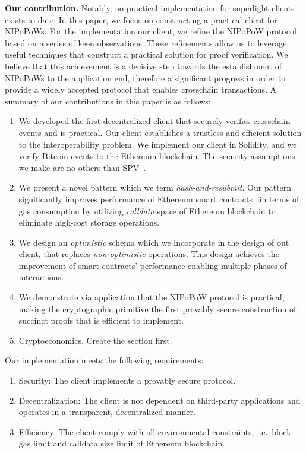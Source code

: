 \textbf{Our contribution.} Notably, no practical implementation for superlight
clients exists to date. In this paper, we focus on constructing a practical
client for NIPoPoWs. For the implementation our client, we refine the
NIPoPoW protocol based on a series of keen observations. These refinements
allow us to leverage useful techniques that construct a practical solution for
proof verification. We believe that this achievement is a decisive step towards
the establishment of NIPoPoWs to the application end, therefore a significant
progress in order to provide a widely accepted protocol that enables crosschain
transactions. A summary of our contributions in this paper is as follows:
\begin{enumerate}
\item We developed the first decentralized client that securely verifies
crosschain events and is practical. Our client establishes a trustless and
efficient solution to the interoperability problem. We implement our client
in Solidity, and we verify Bitcoin events to the Ethereum blockchain. The
security assumptions we make are no others than
SPV~\cite{eclipse, eclipse-ethereum}.
\item We present a novel pattern which we term \emph{hash-and-resubmit}. Our
pattern significantly improves performance of Ethereum smart
contracts~\cite{wood, buterin} in terms of gas consumption by utilizing
\emph{calldata} space of Ethereum blockchain to eliminate high-cost storage
operations.
\item We design an \emph{optimistic} schema which we incorporate
in the design of out client, that replaces \emph{non-optimistic} operations.
This design achieves the improvement of smart contracts' performance enabling
multiple phases of interactions.
\item We demonstrate via application that the NIPoPoW protocol is practical,
making the cryptographic primitive the first provably secure construction of
succinct proofs that is efficient to implement.
\item Cryptoeconomics. Create the section first.

\end{enumerate}

Our implementation meets the following requirements:
\begin{enumerate}
\item Security: The client implements a provably secure protocol.
\item Decentralization: The client is not dependent on third-party applications
and operates in a transparent, decentralized manner.
\item Efficiency: The client comply with all environmental constraints, i.e.\
block gas limit and calldata size limit of Ethereum blockchain.
\end{enumerate}

